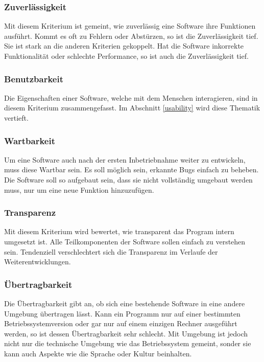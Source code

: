 \subsubsection{Zuverlässigkeit}
Mit diesem Kriterium ist gemeint, wie zuverlässig eine Software ihre Funktionen ausführt.
Kommt es oft zu Fehlern oder Abstürzen, so ist die Zuverlässigkeit tief.
Sie ist stark an die anderen Kriterien gekoppelt.
Hat die Software inkorrekte Funktionalität oder schlechte Performance, so ist auch die Zuverlässigkeit tief.

\subsubsection{Benutzbarkeit}
Die Eigenschaften einer Software, welche mit dem Menschen interagieren, sind in diesem Kriterium zusammengefasst.
Im Abschnitt \ref{usability} wird diese Thematik vertieft.

\subsubsection{Wartbarkeit}
Um eine Software auch nach der ersten Inbetriebnahme weiter zu entwickeln, muss diese Wartbar sein.
Es soll möglich sein, erkannte Bugs einfach zu beheben.
Die Software soll so aufgebaut sein, dass sie nicht vollständig umgebaut werden muss, nur um eine neue Funktion hinzuzufügen.


\subsubsection{Transparenz}
Mit diesem Kriterium wird bewertet, wie transparent das Program intern umgesetzt ist.
Alle Teilkomponenten der Software sollen einfach zu verstehen sein.
Tendenziell verschlechtert sich die Transparenz im Verlaufe der Weiterentwicklungen.


\subsubsection{Übertragbarkeit}
Die Übertragbarkeit gibt an, ob sich eine bestehende Software in eine andere Umgebung übertragen lässt.
Kann ein Programm nur auf einer bestimmten Betriebssystemversion oder gar nur auf einem einzigen Rechner ausgeführt werden, so ist dessen Übertragbarkeit sehr schlecht.
Mit Umgebung ist jedoch nicht nur die technische Umgebung wie das Betriebssystem gemeint, sonder sie kann auch Aspekte wie die Sprache oder Kultur beinhalten.

